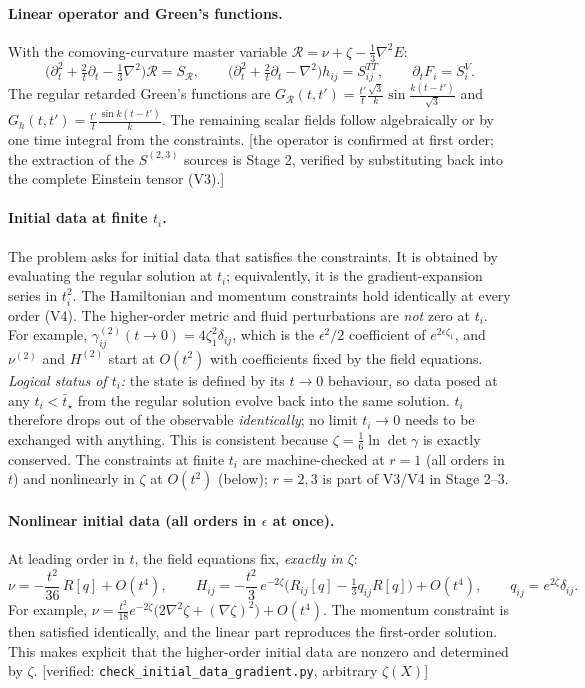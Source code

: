 \documentclass[11pt]{article}
\theoremstyle{definition}
\theoremstyle{remark}
\newcommand{\eps}{\epsilon}
\newcommand{\status}[1]{\textsf{[#1]}}
\begin{document}
\paragraph{Linear operator and Green's functions.} With the
comoving-curvature master variable $\mathcal R=\nu+\zeta-\tfrac13\nabla^2E$:
\[
\Big(\partial_t^2+\tfrac2t\partial_t-\tfrac13\nabla^2\Big)\mathcal R=S_{\mathcal R},\qquad
\Big(\partial_t^2+\tfrac2t\partial_t-\nabla^2\Big)h_{ij}=S^{TT}_{ij},\qquad
\partial_tF_i=S^{V}_i .
\]
The regular retarded Green's functions are
$G_{\mathcal R}(t,t')=\frac{t'}{t}\frac{\sqrt3}{k}\sin\frac{k(t-t')}{\sqrt3}$
and $G_h(t,t')=\frac{t'}{t}\frac{\sin k(t-t')}{k}$. The remaining scalar
fields follow algebraically or by one time integral from the constraints.
\status{the operator is confirmed at first order; the extraction of the
$S^{(2,3)}$ sources is Stage 2, verified by substituting back into the
complete Einstein tensor (V3).}

\paragraph{Initial data at finite $t_i$.} The problem asks for initial data
that satisfies the constraints. It is obtained by evaluating the regular
solution at $t_i$; equivalently, it is the gradient-expansion series in
$t_i^2$. The Hamiltonian and momentum constraints hold identically at every
order (V4). The higher-order metric and fluid perturbations are \emph{not}
zero at $t_i$. For example, $\gamma^{(2)}_{ij}(t\to0)=4\zeta_1^2\delta_{ij}$,
which is the $\eps^2/2$ coefficient of $e^{2\eps\zeta_1}$, and $\nu^{(2)}$
and $H^{(2)}$ start at $O(t^2)$ with coefficients fixed by the field
equations. \emph{Logical status of $t_i$:} the state is defined by its
$t\to0$ behaviour, so data posed at any $t_i<\bar t_\star$ from the regular
solution evolve back into the same solution. $t_i$ therefore drops out of
the observable \emph{identically}; no limit $t_i\to0$ needs to be exchanged
with anything. This is consistent because $\zeta=\tfrac16\ln\det\gamma$ is
exactly conserved. The constraints at finite $t_i$ are machine-checked at
$r=1$ (all orders in $t$) and nonlinearly in $\zeta$ at $O(t^2)$ (below);
$r=2,3$ is part of V3/V4 in Stage 2--3.

\paragraph{Nonlinear initial data (all orders in $\eps$ at once).} At
leading order in $t$, the field equations fix, \emph{exactly in $\zeta$}:
\[
\nu=-\frac{t^2}{36}\,R[q]+O(t^4),\qquad
H_{ij}=-\frac{t^2}{3}\,e^{-2\zeta}\Big(R_{ij}[q]-\tfrac13q_{ij}R[q]\Big)+O(t^4),\qquad
q_{ij}=e^{2\zeta}\delta_{ij}.
\]
For example,
$\nu=\tfrac{t^2}{18}e^{-2\zeta}\big(2\nabla^2\zeta+(\nabla\zeta)^2\big)+O(t^4)$.
The momentum constraint is then satisfied identically, and the linear part
reproduces the first-order solution. This makes explicit that the
higher-order initial data are nonzero and determined by $\zeta$.
\status{verified: \texttt{check\_initial\_data\_gradient.py}, arbitrary $\zeta(X)$}
\end{document}

